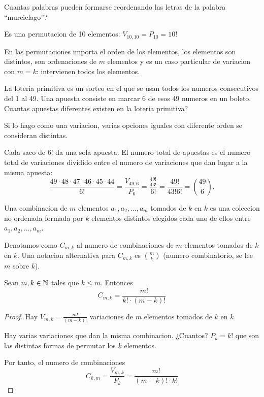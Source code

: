 \begin{example}
	Cuantas palabras pueden formarse reordenando las letras de la palabra ``murcielago''?
	
	Es una permutacion de 10 elementos: \(V_{10,10} = P_{10} = 10!\)
\end{example}

En las permutaciones importa el orden de los elementos, los elementos son distintos, son ordenaciones de \(m \) elementos y es un caso particular de variacion con \(m = k \): intervienen todos los elementos.

\vspace{0.2cm}
\begin{example}
	La loteria primitiva es un sorteo en el que se usan todos los numeros consecutivos del 1 al 49. Una apuesta consiste en marcar 6 de esos 49 numeros en un boleto. Cuantas apuestas diferentes existen en la loteria primitiva?
	
	Si lo hago como una variacion, varias opciones iguales con diferente orden se consideran distintas.
	
	Cada saco de \(6! \) da una sola apuesta. El numero total de apuestas es el numero total de variaciones dividido entre el numero de variaciones que dan lugar a la misma apuesta:
	\[
		\frac{49 \cdot 48 \cdot 47 \cdot 46 \cdot 45 \cdot 44}{6!} = \frac{V_{49,6}}{P_6} = \frac{\frac{49!}{43!}}{6!} = \frac{49!}{43!6!} = \binom{49}{6}.
	\]
\end{example}

\begin{definition}
	Una combinacion de \(m \) elementos \(a_1,a_2,\ldots,a_m \) tomados de \(k \) en \(k \) es una coleccion no ordenada formada por \(k \) elementos distintos elegidos cada uno de ellos entre \(a_1, a_2, \ldots, a_m \).
	
	Denotamos como \(C_{m,k}\) al numero de combinaciones de \(m \) elementos tomados de \(k \) en \(k \). Una notacion alternativa para \(C_{m,k}\) es \(\binom{m }{k }\) (numero combinatorio, se lee \(m \) sobre \(k\)).
\end{definition}
\begin{theorem}
	Sean \(m,k \in \mathbb{N} \) tales que \(k \leq m \). Entonces
	\[
		C_{m,k} = \frac{m!}{k! \cdot (m-k)!}
	\]
\end{theorem}
\begin{proof}
	Hay \(V_{m,k} = \frac{m!}{(m-k)!}\) variaciones de \(m \) elementos tomados de \(k \) en \(k \)
	
	Hay varias variaciones que dan la misma combinacion. ¿Cuantos? \(P_k = k! \) que son las distintas formas de permutar los \(k \) elementos.
	
	Por tanto, el numero de combinaciones
	\[
		C_{k,m} = \frac{V_{m,k}}{P_k} = \frac{m! }{(m-k)! \cdot k!}
	\]
\end{proof}

